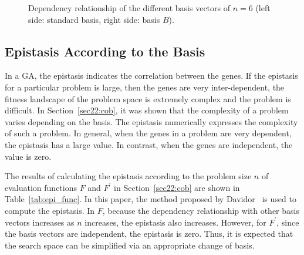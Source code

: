 \begin{figure}[ht!]
	\centering
	\caption{Dependency relationship of the different basis vectors of $ n = 6 $ (left side: standard basis, right side: basis $ B $).} \label{fig:rel}
\end{figure}

\subsection{Epistasis According to the Basis}
In a GA, the epistasis indicates the correlation between the genes. If the epistasis for a particular problem is large, then the genes are very inter-dependent, the fitness landscape of the problem space is extremely complex and the problem is difficult. In Section~\ref{sec22:cob}, it was shown that the complexity of a problem varies depending on the basis. The epistasis numerically expresses the complexity of such a problem. In general, when the genes in a problem are very dependent, the epistasis has a large value. In contrast, when the genes are independent, the value is zero.

The results of calculating the epistasis according to the problem size $ n $ of evaluation functions $ F $ and $ F^\prime $ in Section~\ref{sec22:cob} are shown in Table~\ref{tab:epi_func}. In this paper, the method proposed by Davidor~\cite{davidor1990epistasis} is used to compute the epistasis. In $ F $, because the dependency relationship with other basis vectors increases as $ n $ increases, the epistasis also increases. However, for $ F^\prime $, since the basis vectors are independent, the epistasis is zero. Thus, it is expected that the search space can be simplified via an appropriate change of basis.


